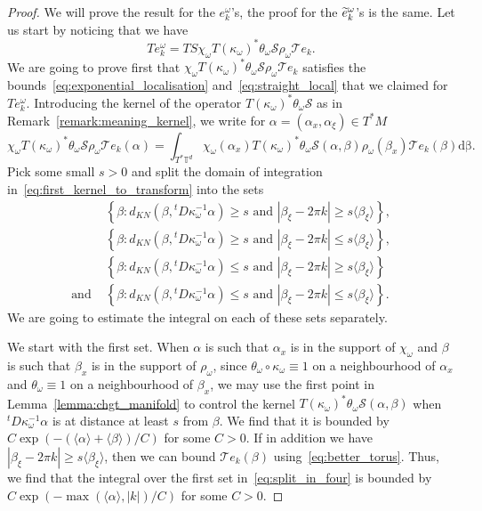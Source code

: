 \documentclass[AHL,Unicode,longabstracts,published]{cedram}
\newcommand{\set}[1]{\left\{ #1 \right\}}
\newcommand{\brac}[1]{\langle #1 \rangle}
\newcommand{\clT}{\mathcal{T}}
\newcommand{\clS}{\mathcal{S}}
\newcommand{\bbT}{\mathbb{T}}
\newcommand{\rmd}{\mathrm{d}}
\let\oldtilde\tilde
\renewcommand*{\tilde}[1]{\mathchoice{\widetilde{#1}}{\widetilde{#1}}{\oldtilde{#1}}{\oldtilde{#1}}}
\begin{document}
\begin{proof}
We will prove the result for the $e_k^\omega$'s, the proof for the $\tilde{e}_k^\omega$'s is the same. Let us start by noticing that we have
\begin{equation}\label{eq:transform_ekomega}
T e_k^\omega = TS \chi_\omega T(\kappa_\omega)^* \theta_\omega \clS \rho_\omega \clT e_k.
\end{equation}
We are going to prove first that $\chi_\omega T(\kappa_\omega)^* \theta_\omega \clS \rho_\omega \clT e_k$ satisfies the bounds~\eqref{eq:exponential_localisation} and~\eqref{eq:straight_local} that we claimed for $T e_k^\omega$. Introducing the kernel of the operator $T(\kappa_\omega)^* \theta_\omega \clS$ as in Remark~\ref{remark:meaning_kernel}, we write for $\alpha = (\alpha_x,\alpha_\xi) \in T^* M$
\begin{equation}\label{eq:first_kernel_to_transform}
\chi_\omega T(\kappa_\omega)^* \theta_\omega \clS \rho_\omega \clT e_k(\alpha) = \int_{T^* \bbT^d} \chi_\omega(\alpha_x) T(\kappa_\omega)^* \theta_\omega \clS(\alpha,\beta) \rho_\omega(\beta_x) \clT e_k(\beta) \rmd \mathrm{\beta}.
\end{equation}
Pick some small $s > 0$ and split the domain of integration in~\eqref{eq:first_kernel_to_transform} into the sets
\begin{equation}\label{eq:split_in_four}
\begin{split}
& \set{\beta: d_{KN}\left(\beta,{}^t D \kappa_\omega^{-1} \alpha\right) \geq s \text{ and } |\beta_\xi - 2 \pi k| \geq s \brac{\beta_\xi}},\\
& \set{\beta: d_{KN}\left(\beta,{}^t D \kappa_\omega^{-1} \alpha\right) \geq s \text{ and } |\beta_\xi - 2 \pi k| \leq s \brac{\beta_\xi}}, \\ &
\set{\beta: d_{KN}\left(\beta,{}^t D \kappa_\omega^{-1} \alpha\right) \leq s \text{ and } |\beta_\xi - 2 \pi k| \geq s \brac{\beta_\xi}} \\ \text{and }
&\set{\beta: d_{KN}\left(\beta,{}^t D \kappa_\omega^{-1} \alpha\right) \leq s \text{ and } |\beta_\xi - 2 \pi k| \leq s \brac{\beta_\xi}}.
\end{split}
\end{equation}
We are going to estimate the integral on each of these sets separately.

We start with the first set. When $\alpha$ is such that $\alpha_x$ is in the support of $\chi_\omega$ and $\beta$ is such that $\beta_x$ is in the support of $\rho_\omega$, since $\theta_\omega \circ \kappa_\omega \equiv 1$ on a neighbourhood of $\alpha_x$ and $\theta_\omega \equiv 1$ on a neighbourhood of $\beta_x$, we may use the first point in Lemma~\ref{lemma:chgt_manifold} to control the kernel $T(\kappa_\omega)^* \theta_\omega \clS(\alpha,\beta)$ when ${}^t D \kappa_\omega^{-1} \alpha$ is at distance at least $s$ from $\beta$. We find that it is bounded by $C\exp(- (\brac{\alpha} + \brac{\beta})/C)$ for some $C > 0$. If in addition we have $|\beta_\xi - 2 \pi k| \geq s \brac{\beta_\xi}$, then we can bound $\clT e_k(\beta)$ using~\eqref{eq:better_torus}. Thus, we find that the integral over the first set in~\eqref{eq:split_in_four} is bounded by $C \exp(- \max(\brac{\alpha},|k|)/C)$ for some $C > 0$.


\end{proof}
\end{document}
